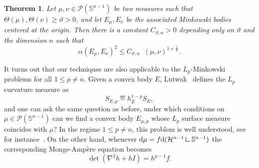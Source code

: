 \documentclass[a4paper, 10pt, twoside]{amsart}
\numberwithin{equation}{section}
\newcommand{\theoname}{Theorem}
\theoremstyle{plain}
\newtheorem{theorem}{\theoname}[section]
\theoremstyle{definition}
\DeclareMathOperator{\dc}{\mathrm{d}_\mathrm{C}}
\begin{document}

\begin{theorem}\label{thm.quantitative_stability_p=1}
    Let $\mu, \nu \in \mathscr{P}(\mathbb{S}^{n-1})$ be two measures such that $\Theta(\mu), \Theta(\nu) \ge \vartheta >0$, and let $E_\mu, E_\nu$ be the associated Minkowski bodies centered at the origin. Then there is a constant $C_{\vartheta,n} >0$ depending only on $\vartheta$ and the dimension $n$ such that 
    \begin{equation}
        {\alpha(E_\mu, E_\nu)}^2
        \le 
        C_{\vartheta,n} {\dc(\mu, \nu)}^{1 + \frac{1}{n}}.
    \end{equation}
\end{theorem}

It turns out that our techniques are also applicable to the $L_p$-Minkowski problems for all $1 \le p \neq n$. Given a convex body $E$, Lutwak~\cite{lutwak1992brunn-minkowki-firey,lutwak1996brunn} defines the $L_p$ curvature measure as
\begin{equation}
    S_{E,p} \eqdef h_E^{1-p}S_E,
\end{equation}
and one can ask the same question as before, under which conditions on $\mu \in \mathscr{P}(\mathbb{S}^{n-1})$ can we find a convex body $E_{\mu,p}$ whose $L_p$ surface measure coincides with $\mu$? In the regime $1 \le p \neq n$, this problem is well understood, see for instance~\cite{cheng1976regularity,hug2005lp,boroczkylogarithmic,HYZ2025}. On the other hand, whenever $\dd\mu=f\dd(\mathcal{H}^{n-1}\mres \mathbb{S}^{n-1})$ the corresponding Monge-Ampère equation becomes  
\[
    \det(\nabla^2 h+h I)=h^{p-1}f. 
\]
\end{document}
